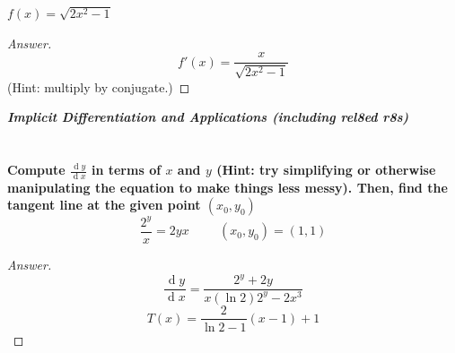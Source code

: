 \documentclass[english]{article}
\renewcommand{\d}[1]{\ensuremath{\operatorname{d}\!{#1}}}
\newcommand{\dydx}[2]{\frac{\d #1}{\d #2}}
\newcommand{\prob}[1]{\setcounter{section}{#1-1}\section{}}
\theoremstyle{remark}
\theoremstyle{definition}
\newcommand{\ild}[1]{\displaystyle{#1}}
\begin{document}
$\ild{f(x)=\sqrt{2x^2-1}}$
\begin{proof}[Answer]
	$$f'(x)=\frac{x}{\sqrt{2x^2-1}}$$
(Hint: multiply by conjugate.)
\end{proof}
     
	\newpage
	\begin{center}{\Large\textbf{\emph{Implicit Differentiation and Applications (including rel8ed r8s)}}}\end{center}
	\prob{1} \textbf{Compute $\dydx{y}{x}$ in terms of $x$ and $y$ (Hint: try simplifying or otherwise manipulating the equation to make things less messy). Then, find the tangent line at the given point $(x_0,y_0)$}\newline
	$$\ild{\frac{2^{y}}{x}=2yx}\hspace{1cm}(x_0,y_0)=(1,1)$$
	\begin{proof}[Answer]
$$\dydx{y}{x}=\frac{2^y+2y}{x(\ln2)2^y-2x^3}$$ $$T(x)=\frac{2}{\ln2-1}(x-1)+1$$
	\end{proof}
\end{document}
